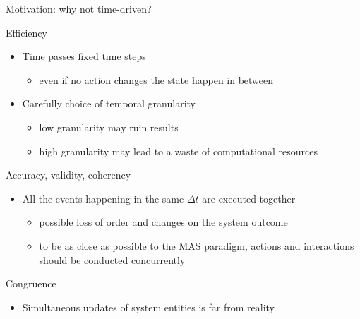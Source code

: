 \documentclass[presentation]{beamer} %
\begin{document}
\begin{frame}{Motivation: why not  time-driven?}

  \begin{block}{Efficiency}
    \begin{itemize}
      	\item Time passes fixed time steps
        \begin{itemize}
          	\item even if no action changes the state happen in between
	\end{itemize}
      	\item Carefully choice of temporal granularity
      	\begin{itemize}
      		\item low granularity may ruin results
		\item high granularity may lead to a waste of computational resources
	\end{itemize}
    \end{itemize}
 \end{block}
  
  \begin{block}{Accuracy, validity, coherency}
    \begin{itemize}
      \item All the events happening in the same $\Delta{}t$ are executed together
        \begin{itemize}
      		\item possible loss of order and changes on the system outcome
		\item to be as close as possible to the MAS paradigm, actions and interactions should be conducted concurrently
	 \end{itemize}
    \end{itemize}
  \end{block}
  
  \begin{block}{Congruence}
    \begin{itemize}
      \item  Simultaneous updates of system entities is far from reality
    \end{itemize}
  \end{block}

\end{frame}
\end{document}
